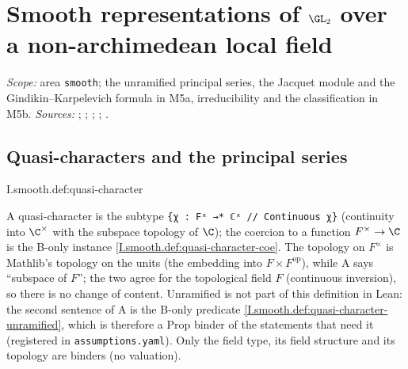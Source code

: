 
\chapter{\texorpdfstring{Smooth representations of $\GL_2$ over a non-archimedean local field}{Smooth representations of GL₂ over a non-archimedean local field}}\label{ch:ch-1-02-smooth}

\noindent\emph{Scope:} area \texttt{smooth}; the unramified principal series, the Jacquet module and the
Gindikin--Karpelevich formula in M5a, irreducibility and the classification in M5b. \emph{Sources:} \cite[§§2--4]{JL};
\cite[§§3--7, §9]{Cas-p}; \cite{Bern}; \cite{BZ}; \cite{A-SC}.

\section{Quasi-characters and the principal series}

\begin{definition}
\end{definition}
\begin{tfformal}{I.smooth.def:quasi-character}
\begin{tffidelity}
A quasi-character is the subtype \texttt{\{χ : Fˣ →* ℂˣ // Continuous χ\}} (continuity into $\C^\times$ with the subspace topology of $\C$); the coercion to a function $F^\times\to\C$ is the B-only instance \cref{I.smooth.def:quasi-character-coe}. The topology on $F^\times$ is Mathlib's topology on the units (the embedding into $F\times F^{\mathrm{op}}$), while A says ``subspace of $F$''; the two agree for the topological field $F$ (continuous inversion), so there is no change of content. Unramified is not part of this definition in Lean: the second sentence of A is the B-only predicate \cref{I.smooth.def:quasi-character-unramified}, which is therefore a Prop binder of the statements that need it (registered in \texttt{assumptions.yaml}). Only the field type, its field structure and its topology are binders (no valuation).
\end{tffidelity}
\end{tfformal}

